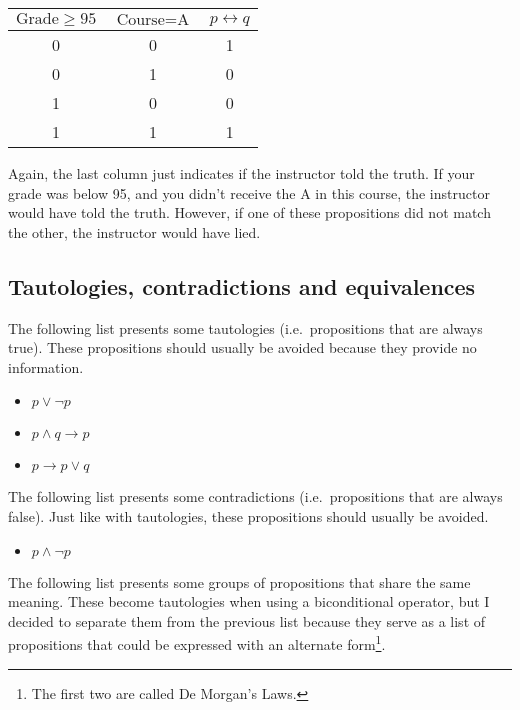 \documentclass{article}
\begin{document}
\medskip
\begin{center}
  \begin{tabular}{| c | c | c |}
    \hline
    $\text{Grade} \geq 95$ & $\text{Course} = \text{A}$ & $p \leftrightarrow q$ \\
    \hline
    0 & 0 & 1 \\
    0 & 1 & 0 \\
    1 & 0 & 0 \\
    1 & 1 & 1 \\
    \hline
  \end{tabular}
\end{center}
\medskip

Again, the last column just indicates if the instructor told the truth. If your
grade was below 95, and you didn't receive the A in this course, the instructor
would have told the truth. However, if one of these propositions did not match
the other, the instructor would have lied.

\subsection{Tautologies, contradictions and equivalences}

The following list presents some tautologies (i.e.~propositions that are always
true). These propositions should usually be avoided because they provide no
information.

\begin{itemize}
  \item $p \lor \neg p$
  \item $p \land q \to p$
  \item $p \to p \lor q$
\end{itemize}

The following list presents some contradictions (i.e.~propositions that are
always false). Just like with tautologies, these propositions should usually be
avoided.

\begin{itemize}
  \item $p \land \neg p$
\end{itemize}

The following list presents some groups of propositions that share the same
meaning. These become tautologies when using a biconditional operator, but I
decided to separate them from the previous list because they serve as a list of
propositions that could be expressed with an alternate form\footnote{The first
two are called De Morgan's Laws.}.
\end{document}
